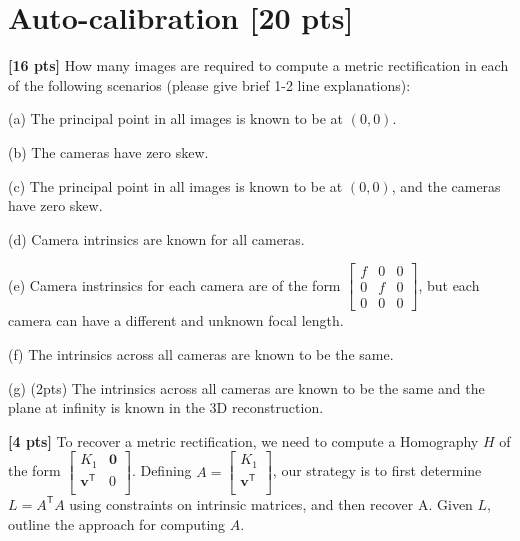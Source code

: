 \documentclass[11pt,addpoints,answers]{exam}
\numberwithin{equation}{section} %
\numberwithin{figure}{section} %
\numberwithin{table}{section} %
\begin{document}
\section{Auto-calibration [20 pts]}
\begin{questions}

\question \textbf{[16 pts]} How many images are required to compute a metric rectification in each of the following scenarios (please give brief 1-2 line explanations):

(a) The principal point in all images is known to be at $(0,0)$.

(b) The cameras have zero skew.

(c) The principal point in all images is known to be at $(0,0)$, and the cameras have zero skew.

(d)  Camera intrinsics are known for all cameras.

(e) Camera instrinsics for each camera are of the form
$
\begin{bmatrix}
f & 0 & 0 \\
0 & f & 0 \\
0 & 0 & 0
\end{bmatrix}$, but each camera can have a different and unknown focal length.

(f) The intrinsics across all cameras are known to be the same.

(g) (2pts) The intrinsics across all cameras are known to be the same and the plane at infinity is known in the 3D reconstruction.

\begin{tcolorbox}[fit,height=11cm, width=\textwidth, blank, borderline={0.5pt}{-2pt},halign=left, valign=center, nobeforeafter]

\end{tcolorbox}

\newpage

\question \textbf{[4 pts]} To recover a metric rectification, we need to compute a Homography $H$ of the form $\begin{bmatrix}
K_1 & \mathbf{0} \\
\mathbf{v}^{\mathsf{T}} & 0 \\
\end{bmatrix}$. Defining $A=\begin{bmatrix}
K_1 \\
\mathbf{v}^{\mathsf{T}} \\
\end{bmatrix}$, our strategy is to first determine $L=A^{\mathsf{T}}A$ using constraints on intrinsic matrices, and then recover A. Given $L$, outline the approach for computing $A$.


\end{questions}
\end{document}
